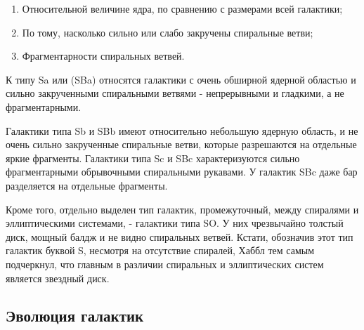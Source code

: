 \begin{enumerate}
	\item Относительной величине ядра, по сравнению с размерами всей галактики;
	
	\item По тому, насколько сильно или слабо закручены спиральные ветви;
	
	\item Фрагментарности спиральных ветвей.
\end{enumerate}

К типу Sa или (SBa) относятся галактики с очень обширной ядерной областью и сильно закрученными спиральными ветвями - непрерывными и гладкими, а не фрагментарными.

Галактики типа Sb и SBb имеют относительно небольшую ядерную область, и не очень сильно закрученные спиральные ветви, которые разрешаются на отдельные яркие фрагменты. Галактики типа Sc и SBc характеризуются сильно фрагментарными обрывочными спиральными рукавами. У галактик SBc даже бар разделяется на отдельные фрагменты.

Кроме того, отдельно выделен тип галактик, промежуточный, между спиралями и эллиптическими системами, - галактики типа SO. У них чрезвычайно толстый диск, мощный балдж и не видно спиральных ветвей. Кстати, обозначив этот тип галактик буквой S, несмотря на отсутствие спиралей, Хаббл тем самым подчеркнул, что главным в различии спиральных и эллиптических систем является звездный диск.

\subsection{Эволюция галактик}